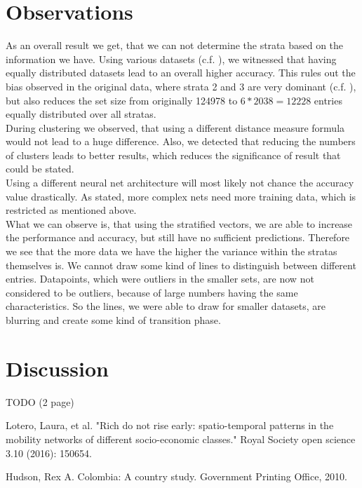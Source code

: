 \documentclass[runningheads]{llncs}
\begin{document}
	\section{Observations}
	As an overall result we get, that we can not determine the strata based on the information we have.
	Using various datasets (c.f. ), we witnessed that having equally distributed datasets lead to an overall higher accuracy. This rules out the bias observed in the original data, where strata 2 and 3 are very dominant (c.f. ), but also reduces the set size from originally 124978 to $6*2038=12228$ entries equally distributed over all stratas.\\
	During clustering we observed, that using a different distance measure formula would not lead to a huge difference. Also, we detected that reducing the numbers of clusters leads to better results, which reduces the significance of result that could be stated.\\
	Using a different neural net architecture will most likely not chance the accuracy value drastically. As stated, more complex nets need more training data, which is restricted as mentioned above.\\
	What we can observe is, that using the stratified vectors, we are able to increase the performance and accuracy, but still have no sufficient predictions. Therefore we see that the more data we have the higher the variance within the stratas themselves is. We cannot draw some kind of lines to distinguish between different entries. Datapoints, which were outliers in the smaller sets, are now not considered to be outliers, because of large numbers having the same characteristics. So the lines, we were able to draw for smaller datasets, are blurring and create some kind of transition phase.\\ %
	
	
	\section{Discussion}
	TODO (2 page)
	
	
	\begin{thebibliography}{8}
		Lotero, Laura, et al. "Rich do not rise early: spatio-temporal patterns in the mobility networks of different socio-economic classes." Royal Society open science 3.10 (2016): 150654.
		
		Hudson, Rex A. Colombia: A country study. Government Printing Office, 2010.
		
	\end{thebibliography}
\end{document}
